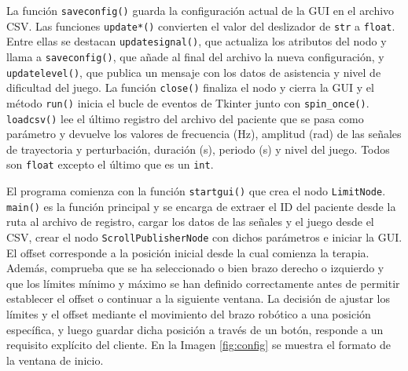 La función \verb|saveconfig()| guarda la configuración actual de la GUI en el archivo CSV.
Las funciones \verb|update*()| convierten el valor del deslizador de \verb|str| a \verb|float|.
Entre ellas se destacan \verb|updatesignal()|, que actualiza los atributos del nodo y llama a \verb|saveconfig()|, que añade al final del archivo la nueva configuración, y \verb|updatelevel()|, que publica un mensaje con los datos de asistencia y nivel de dificultad del juego.
La función \verb|close()| finaliza el nodo y cierra la GUI y el método \verb|run()| inicia el bucle de eventos de Tkinter junto con \verb|spin_once()|.
\verb|loadcsv()| lee el último registro del archivo del paciente que se pasa como parámetro y devuelve los valores de frecuencia (Hz), amplitud (rad) de las señales de trayectoria y perturbación, duración (s), periodo (s) y nivel del juego.
Todos son \verb|float| excepto el último que es un \verb|int|.

El programa comienza con la función \verb|startgui()| que crea el nodo \verb|LimitNode|.
\verb|main()| es la función principal y se encarga de extraer el ID del paciente desde la ruta al archivo de registro, cargar los datos de las señales y el juego desde el CSV, crear el nodo \verb|ScrollPublisherNode| con dichos parámetros e iniciar la GUI.
El offset corresponde a la posición inicial desde la cual comienza la terapia.
Además, comprueba que se ha seleccionado o bien brazo derecho o izquierdo y que los límites mínimo y máximo se han definido correctamente antes de permitir establecer el offset o continuar a la siguiente ventana.
La decisión de ajustar los límites y el offset mediante el movimiento del brazo robótico a una posición específica, y luego guardar dicha posición a través de un botón, responde a un requisito explícito del cliente.
En la Imagen \ref{fig:config} se muestra el formato de la ventana de inicio.

